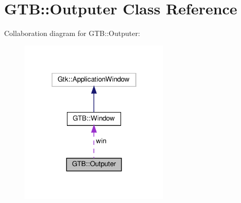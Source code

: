 \hypertarget{a00040}{}\section{G\+TB\+:\+:Outputer Class Reference}
\label{a00040}


Collaboration diagram for G\+TB\+:\+:Outputer\+:\nopagebreak
\begin{figure}[H]
\begin{center}
\leavevmode
\includegraphics[width=202pt]{a00038}
\end{center}
\end{figure}
